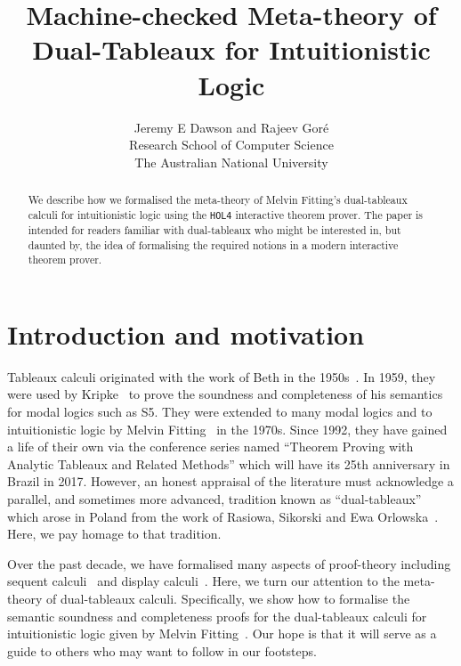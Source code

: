 \documentclass[a4paper]{article}
\title{Machine-checked Meta-theory of Dual-Tableaux for Intuitionistic
Logic}
\author{Jeremy E Dawson and Rajeev Gor\'e
\\ Research School of Computer Science
\\  The Australian National University}
\date{}
\newcommand{\hol}{\texttt{HOL4}}
\begin{document}
\maketitle

\begin{abstract}
  We describe how we formalised the meta-theory of Melvin Fitting's
  dual-tableaux calculi for intuitionistic logic using the \hol{}
  interactive theorem prover. The paper is intended for readers
  familiar with dual-tableaux  who might be interested in, but daunted
  by, the idea of
  formalising the required notions in a modern interactive theorem
  prover. 
\end{abstract}  

\tableofcontents

\newpage
\section{Introduction and motivation}


Tableaux calculi originated with the work of Beth in the
1950s~\cite{beth-padoas}. In 1959, they were used by
Kripke~\cite{kripke-completeness} to prove the soundness and
completeness of his semantics for modal logics such as S5.  They were
extended to many modal logics and to intuitionistic logic by Melvin
Fitting~\cite{fitting-proof} in the 1970s. Since 1992, they have
gained a life of their own via the conference series named ``Theorem
Proving with Analytic Tableaux and Related Methods'' which will have
its 25th anniversary in Brazil in 2017. However, an honest appraisal
of the literature must acknowledge a parallel, and sometimes more
advanced, tradition known as ``dual-tableaux'' which arose in Poland
from the work of Rasiowa, Sikorski and Ewa
Orlowska~\cite{orlowska-joanna-book}.  Here, we pay homage to that
tradition.

Over the past decade, we have formalised many aspects
of proof-theory including sequent
calculi~\cite{DBLP:conf/lpar/DawsonG10} and display
calculi~\cite{dawson-gore-formalised-cut-admissibility}. Here, we turn
our attention to the meta-theory of dual-tableaux
calculi. Specifically, we show how to formalise the semantic soundness
and completeness proofs for the dual-tableaux
calculi for intuitionistic logic given by Melvin
Fitting~\cite{fitting-dual-tableau}.  Our hope is that it will serve
as a guide to others who may want to follow in our footsteps.
\end{document}
